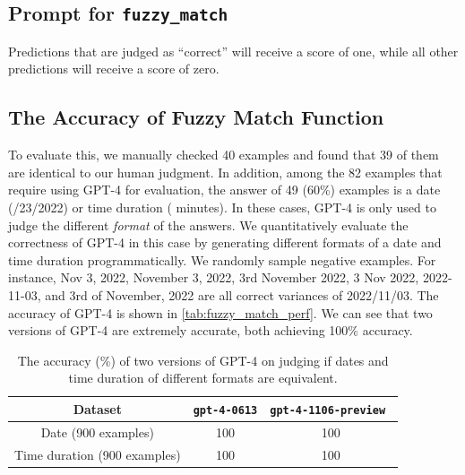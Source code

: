 \subsection{Prompt for \texttt{fuzzy\_match}}\label{app:prompt_fuzzy_match}

Predictions that are judged as ``correct'' will receive a score of one, while all other predictions will receive a score of zero.

\subsection{The Accuracy of Fuzzy Match Function}\label{app:fuzzy_match_perf}
To evaluate this, we manually checked 40 examples and found that 39 of them are identical to our human judgment. 
In addition, among the 82 examples that require using GPT-4 for evaluation, the answer of 49 (60\%) examples is a date (/23/2022) or time duration ( minutes). 
In these cases, GPT-4 is only used to judge the different \emph{format} of the answers.
We quantitatively evaluate the correctness of GPT-4 in this case by generating different formats of a date and time duration programmatically. 
We randomly sample negative examples. For instance, Nov 3, 2022, November 3, 2022, 3rd November 2022, 3 Nov 2022, 2022-11-03, and 3rd of November, 2022 are all correct variances of 2022/11/03. The accuracy of GPT-4 is shown in \autoref{tab:fuzzy_match_perf}.
We can see that two versions of GPT-4 are extremely accurate, both achieving 100\% accuracy.
\begin{table}[]
    \centering
    \begin{tabular}{ccc}
    \toprule
     \textbf{Dataset} & \texttt{gpt-4-0613} & \texttt{gpt-4-1106-preview } \\
     \midrule
     Date (900 examples) & 100 & 100 \\
     Time duration (900 examples) & 100 & 100 \\
     \bottomrule
    \end{tabular}
    \caption{The accuracy (\%) of two versions of GPT-4 on judging if dates and time duration of different formats are equivalent.}
    \label{tab:fuzzy_match_perf}
\end{table}


